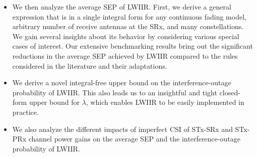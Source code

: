 \documentclass[12pt,draftcls,peerreview,onecolumn]{IEEEtran}
\newcommand{\lam}{\lambda}
\newcommand{\Nt}{{N_t}}
\begin{document}
\begin{itemize}
%
\item We then analyze the average SEP of LWIIR. First, we derive a general expression that is in a single integral form for any continuous  fading model, arbitrary number of receive antennas at the SRx, and many constellations. We gain several insights about its behavior by considering various special cases of interest. %
Our extensive benchmarking results bring out the significant reductions in the average SEP achieved by LWIIR compared to the rules considered in the literature and their adaptations. 
% 
\item We derive a novel integral-free upper bound on the interference-outage probability of LWIIR. This also leads us to an insightful and tight closed-form upper bound for $\lam$, which enables LWIIR to be easily implemented in practice.
% 
%

\item We also analyze the different impacts of imperfect CSI of STx-SRx and STx-PRx channel power gains on the average SEP and the interference-outage probability of LWIIR.

\end{itemize}


\end{document}
